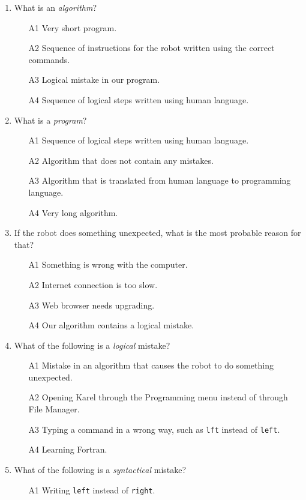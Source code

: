 \begin{enumerate}
\item What is an {\em algorithm}?
\begin{enumerate}
\item[A1] Very short program.
\item[A2] Sequence of instructions for the robot written using the correct commands.
\item[A3] Logical mistake in our program.
\item[A4] Sequence of logical steps written using human language.
\end{enumerate}
\item What is a {\em program}?
\begin{enumerate}
\item[A1] Sequence of logical steps written using human language.
\item[A2] Algorithm that does not contain any mistakes.
\item[A3] Algorithm that is translated from human language to programming language.
\item[A4] Very long algorithm.
\end{enumerate}
\item If the robot does something unexpected, what is the most probable reason for that?
\begin{enumerate}
\item[A1] Something is wrong with the computer.
\item[A2] Internet connection is too slow.
\item[A3] Web browser needs upgrading.
\item[A4] Our algorithm contains a logical mistake.
\end{enumerate}
\item What of the following is a {\em logical} mistake?
\begin{enumerate}
\item[A1] Mistake in an algorithm that causes the robot to do something unexpected.
\item[A2] Opening Karel through the Programming menu instead of through File Manager. 
\item[A3] Typing a command in a wrong way, such as {\tt lft} instead of {\tt left}.
\item[A4] Learning Fortran.
\end{enumerate}
\item What of the following is a {\em syntactical} mistake?
\begin{enumerate}
\item[A1] Writing {\tt left} instead of {\tt right}.

\end{enumerate}
\end{enumerate}
